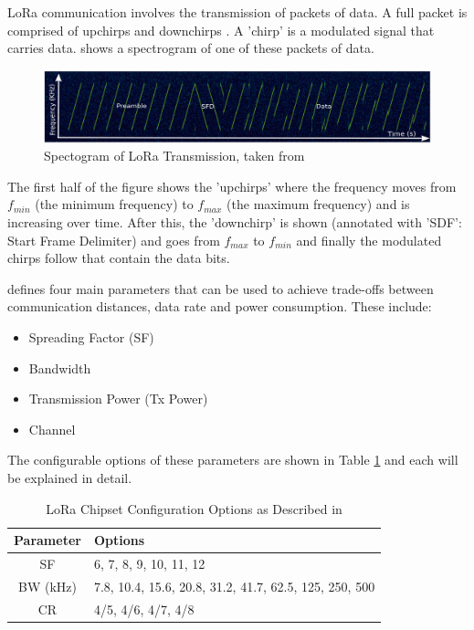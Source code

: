 \documentclass[a4paper,twoside,12pt]{report}
\begin{document}
LoRa communication involves the transmission of packets of data. A full packet is comprised of upchirps and downchirps \citep{Liando2019KnownStudy}. A 'chirp' is a modulated signal that carries data.  shows a spectrogram of one of these packets of data.

\begin{figure}[ht]
	\centering
	\includegraphics[width=0.8\linewidth]{images/LoRa transmission spectogram.png}
	\caption{Spectogram of LoRa Transmission, taken from \cite{Liando2019KnownStudy}}
	\label{fig:LoRaTransmissionSpectogram}
\end{figure}

The first half of the figure shows the 'upchirps' where the frequency moves from $f_{min}$ (the minimum frequency) to $f_{max}$ (the maximum frequency) and is increasing over time. After this, the 'downchirp' is shown (annotated with 'SDF': Start Frame Delimiter) and goes from $f_{max}$ to $f_{min}$ and finally the modulated chirps follow that contain the data bits.
\newline

\cite{Liando2019KnownStudy} defines four main parameters that can be used to achieve trade-offs between communication distances, data rate and power consumption. These include:
\begin{itemize}
    \item Spreading Factor (SF)
    \item Bandwidth
    \item Transmission Power (Tx Power)
    \item Channel
\end{itemize}

The configurable options of these parameters are shown in Table \ref{tab:LoRaParams} and each will be explained in detail.
\begin{table}[!htbp]
	\centering
	\caption{LoRa Chipset Configuration Options as Described in \cite{SemtechDatasheet}}
	\label{tab:LoRaParams}
\begin{tabular}{cl}
	\hline
	Parameter & Options\\
	\hline\hline 
	SF & 6, 7, 8, 9, 10, 11, 12 \\ 
	BW (kHz) & 7.8, 10.4, 15.6, 20.8, 31.2, 41.7, 62.5, 125, 250, 500 \\ 
    CR & 4/5, 4/6, 4/7, 4/8 \\ 
	\hline
\end{tabular} 
\end{table}
\end{document}
